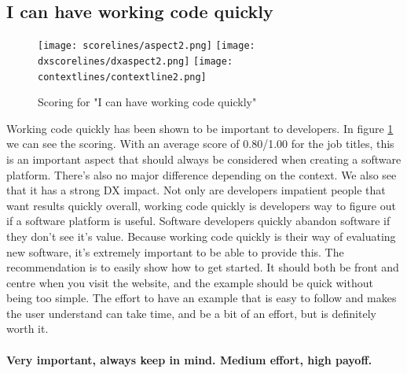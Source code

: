 \documentclass{cslthse-msc}
\begin{document}
    \subsection{I can have working code quickly}
    \begin{figure}[H]
        \centering
        \texttt{[image: scorelines/aspect2.png]}
        \texttt{[image: dxscorelines/dxaspect2.png]}
        \texttt{[image: contextlines/contextline2.png]}
        \caption{Scoring for "I can have working code quickly"}
        \label{fig:aspect2}
    \end{figure}
    Working code quickly has been shown to be important to developers. In figure \ref{fig:aspect2} we can see the scoring. With an average score of 0.80/1.00 for the job titles, this is an important aspect that should always be considered when creating a software platform. There's also no major difference depending on the context. We also see that it has a strong DX impact. Not only are developers impatient people that want results quickly overall, working code quickly is developers way to figure out if a software platform is useful. Software developers quickly abandon software if they don't see it's value. Because working code quickly is their way of evaluating new software, it's extremely important to be able to provide this. The recommendation is to easily show how to get started. It should both be front and centre when you visit the website, and the example should be quick without being too simple. The effort to have an example that is easy to follow  and makes the user understand can take time, and be a bit of an effort, but is definitely worth it.\\ \\
    \textbf{Very important, always keep in mind. Medium effort, high payoff.}
\end{document}
